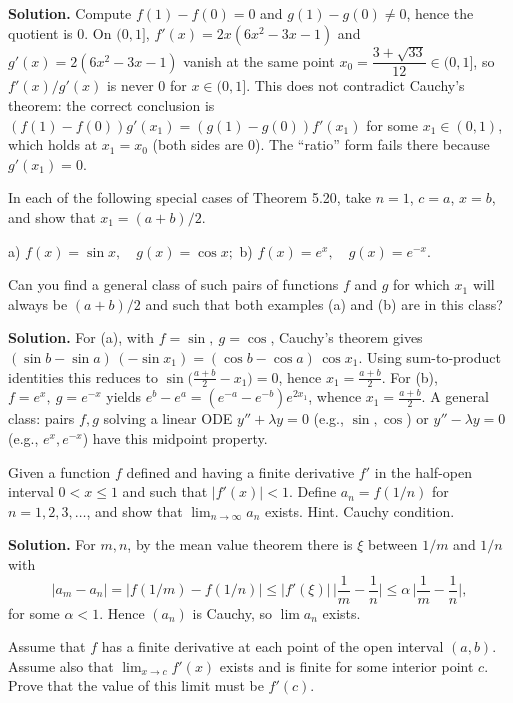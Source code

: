 \noindent\textbf{Solution.}
Compute $f(1)-f(0)=0$ and $g(1)-g(0)\ne 0$, hence the quotient is $0$. On $(0,1]$, $f'(x)=2x(6x^2-3x-1)$ and $g'(x)=2(6x^2-3x-1)$ vanish at the same point $x_0=\dfrac{3+\sqrt{33}}{12}\in(0,1]$, so $f'(x)/g'(x)$ is never $0$ for $x\in(0,1]$. This does not contradict Cauchy’s theorem: the correct conclusion is $(f(1)-f(0))g'(x_1)=(g(1)-g(0))f'(x_1)$ for some $x_1\in(0,1)$, which holds at $x_1=x_0$ (both sides are $0$). The “ratio” form fails there because $g'(x_1)=0$.

\begin{problembox}
In each of the following special cases of Theorem 5.20, take \( n = 1 \), \( c = a \), \( x = b \), and show that \( x_1 = (a + b)/2 \).

a) \( f(x) = \sin x, \quad g(x) = \cos x; \) 
b) \( f(x) = e^x, \quad g(x) = e^{-x} \).

Can you find a general class of such pairs of functions \( f \) and \( g \) for which \( x_1 \) will always be \( (a + b)/2 \) and such that both examples (a) and (b) are in this class?
\end{problembox}

\noindent\textbf{Solution.}
For (a), with $f=\sin,\ g=\cos$, Cauchy’s theorem gives $(\sin b-\sin a)\,(-\sin x_1)=(\cos b-\cos a)\,\cos x_1$. Using sum-to-product identities this reduces to $\sin\big(\tfrac{a+b}{2}-x_1\big)=0$, hence $x_1=\tfrac{a+b}{2}$. For (b), $f=e^x,\ g=e^{-x}$ yields $e^b-e^a=(e^{-a}-e^{-b})e^{2x_1}$, whence $x_1=\tfrac{a+b}{2}$. A general class: pairs $f,g$ solving a linear ODE $y''+\lambda y=0$ (e.g., $\sin,\cos$) or $y''-\lambda y=0$ (e.g., $e^x,e^{-x}$) have this midpoint property.

\begin{problembox}
Given a function \( f \) defined and having a finite derivative \( f' \) in the half-open interval \( 0 < x \leq 1 \) and such that \( |f'(x)| < 1 \). Define \( a_n = f(1/n) \) for \( n = 1, 2, 3, \ldots \), and show that \( \lim_{n \to \infty} a_n \) exists. Hint. Cauchy condition.
\end{problembox}

\noindent\textbf{Solution.}
For $m,n$, by the mean value theorem there is $\xi$ between $1/m$ and $1/n$ with
\[|a_m-a_n|=|f(1/m)-f(1/n)|\le |f'(\xi)|\,\Big|\frac1m-\frac1n\Big|\le \alpha\,\Big|\frac1m-\frac1n\Big|,\]
for some $\alpha<1$. Hence $(a_n)$ is Cauchy, so $\lim a_n$ exists.

\begin{problembox}
Assume that \( f \) has a finite derivative at each point of the open interval \( (a, b) \). Assume also that \( \lim_{x \to c} f'(x) \) exists and is finite for some interior point \( c \). Prove that the value of this limit must be \( f'(c) \).
\end{problembox}

